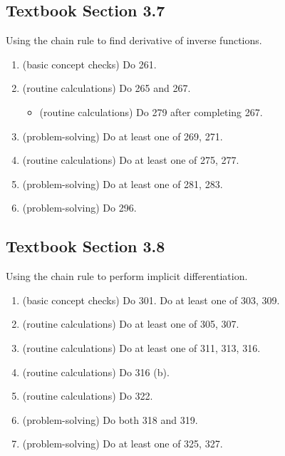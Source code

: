 \documentclass[./main.tex]{subfiles}
\begin{document}
\subsection*{Textbook Section 3.7}

Using the chain rule to find derivative of inverse functions.
\begin{enumerate}
  \item (basic concept checks) Do 261. 
  \item (routine calculations) Do 265 and 267.
    \begin{itemize}
      \item (routine calculations) Do 279 after completing 267.
    \end{itemize}
  \item (problem-solving) Do at least one of 269, 271. 
  \item (routine calculations) Do at least one of 275, 277.
  \item (problem-solving) Do at least one of 281, 283.
  \item (problem-solving) Do 296.
\end{enumerate}

\subsection*{Textbook Section 3.8}

Using the chain rule to perform implicit differentiation.
\begin{enumerate}
  \item (basic concept checks) Do 301. Do at least one of 303, 309.
  \item (routine calculations) Do at least one of 305, 307. 
  \item (routine calculations) Do at least one of 311, 313, 316.
  \item (routine calculations) Do 316 (b).
  \item (routine calculations) Do 322.
  \item (problem-solving) Do both 318 and 319.
  \item (problem-solving) Do at least one of 325, 327.
\end{enumerate}
\end{document}
